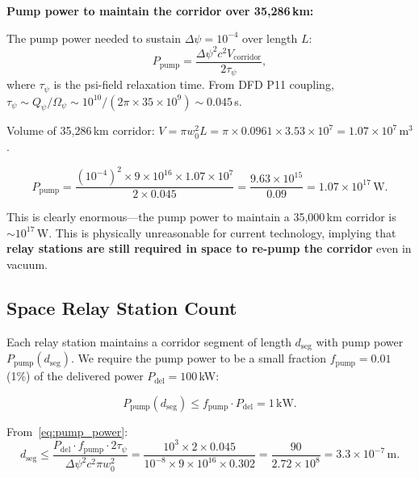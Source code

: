 \documentclass[aps,prd,twocolumn,superscriptaddress]{revtex4-2}
\begin{document}
\textbf{Pump power to maintain the corridor over 35,286\,km:}

The pump power needed to sustain $\Delta\psi = 10^{-4}$ over length $L$:
\begin{equation}
P_\mathrm{pump} = \frac{\Delta\psi^2 c^2 V_\mathrm{corridor}}{2\tau_\psi},
\label{eq:pump_power}
\end{equation}
where $\tau_\psi$ is the psi-field relaxation time.  From DFD P11 coupling,
$\tau_\psi \sim Q_\psi/\Omega_\psi \sim 10^{10}/(2\pi\times35\times10^9) \sim 0.045$\,s.

Volume of 35,286\,km corridor:
$V = \pi w_0^2 L = \pi\times0.0961\times3.53\times10^7 = 1.07\times10^7$\,m$^3$.

\begin{equation}
P_\mathrm{pump} = \frac{(10^{-4})^2\times9\times10^{16}\times1.07\times10^7}
{2\times0.045}
= \frac{9.63\times10^{15}}{0.09}
= 1.07\times10^{17}\,\mathrm{W}.
\label{eq:pump_num}
\end{equation}

This is clearly enormous---the pump power to maintain a 35,000\,km
corridor is $\sim10^{17}$\,W.  This is physically unreasonable for
current technology, implying that \textbf{relay stations are still
required in space to re-pump the corridor} even in vacuum.

\subsection{Space Relay Station Count}

Each relay station maintains a corridor segment of length $d_\mathrm{seg}$
with pump power $P_\mathrm{pump}(d_\mathrm{seg})$.  We require the
pump power to be a small fraction $f_\mathrm{pump} = 0.01$ (1\%) of
the delivered power $P_\mathrm{del} = 100$\,kW:

\begin{equation}
P_\mathrm{pump}(d_\mathrm{seg}) \leq f_\mathrm{pump}\cdot P_\mathrm{del}
= 1\,\mathrm{kW}.
\label{eq:pump_budget}
\end{equation}

From~\eqref{eq:pump_power}:
\begin{equation}
d_\mathrm{seg} \leq \frac{P_\mathrm{del}\cdot f_\mathrm{pump}\cdot 2\tau_\psi}
{\Delta\psi^2 c^2 \pi w_0^2}
= \frac{10^3\times2\times0.045}
{10^{-8}\times9\times10^{16}\times0.302}
= \frac{90}
{2.72\times10^{8}}
= 3.3\times10^{-7}\,\mathrm{m}.
\label{eq:d_seg_space}
\end{equation}
\end{document}
